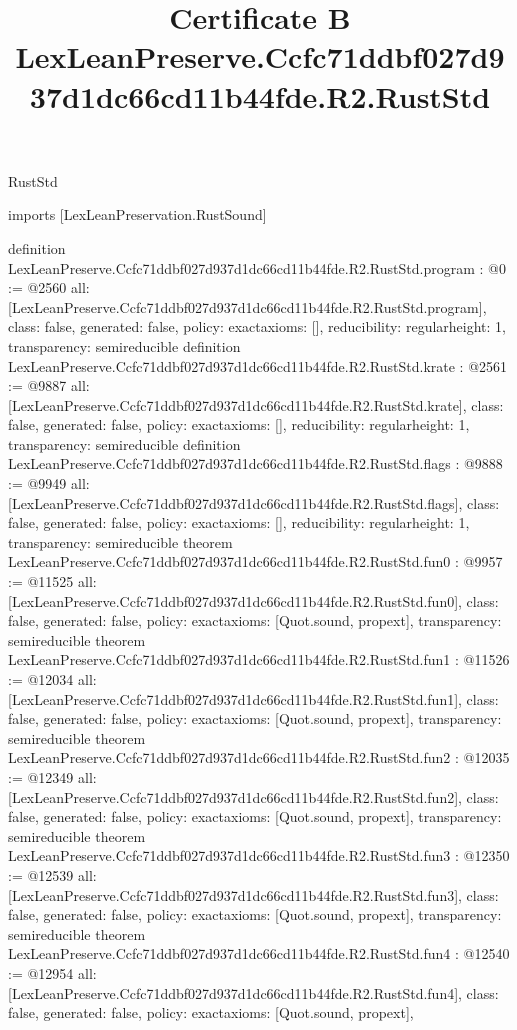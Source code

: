 \begin{lexlean}{RustStd}
\title{Certificate B LexLeanPreserve.Ccfc71ddbf027d937d1dc66cd11b44fde.R2.RustStd}
\begin{coremodule}
imports [LexLeanPreservation.RustSound]

definition LexLeanPreserve.Ccfc71ddbf027d937d1dc66cd11b44fde.R2.RustStd.program : @0 := @2560 {
  all: [LexLeanPreserve.Ccfc71ddbf027d937d1dc66cd11b44fde.R2.RustStd.program],
  class: false,
  generated: false,
  policy: exact{axioms: []},
  reducibility: regular{height: 1},
  transparency: semireducible
}
definition LexLeanPreserve.Ccfc71ddbf027d937d1dc66cd11b44fde.R2.RustStd.krate : @2561 := @9887 {
  all: [LexLeanPreserve.Ccfc71ddbf027d937d1dc66cd11b44fde.R2.RustStd.krate],
  class: false,
  generated: false,
  policy: exact{axioms: []},
  reducibility: regular{height: 1},
  transparency: semireducible
}
definition LexLeanPreserve.Ccfc71ddbf027d937d1dc66cd11b44fde.R2.RustStd.flags : @9888 := @9949 {
  all: [LexLeanPreserve.Ccfc71ddbf027d937d1dc66cd11b44fde.R2.RustStd.flags],
  class: false,
  generated: false,
  policy: exact{axioms: []},
  reducibility: regular{height: 1},
  transparency: semireducible
}
theorem LexLeanPreserve.Ccfc71ddbf027d937d1dc66cd11b44fde.R2.RustStd.fun0 : @9957 := @11525 {
  all: [LexLeanPreserve.Ccfc71ddbf027d937d1dc66cd11b44fde.R2.RustStd.fun0],
  class: false,
  generated: false,
  policy: exact{axioms: [Quot.sound, propext]},
  transparency: semireducible
}
theorem LexLeanPreserve.Ccfc71ddbf027d937d1dc66cd11b44fde.R2.RustStd.fun1 : @11526 := @12034 {
  all: [LexLeanPreserve.Ccfc71ddbf027d937d1dc66cd11b44fde.R2.RustStd.fun1],
  class: false,
  generated: false,
  policy: exact{axioms: [Quot.sound, propext]},
  transparency: semireducible
}
theorem LexLeanPreserve.Ccfc71ddbf027d937d1dc66cd11b44fde.R2.RustStd.fun2 : @12035 := @12349 {
  all: [LexLeanPreserve.Ccfc71ddbf027d937d1dc66cd11b44fde.R2.RustStd.fun2],
  class: false,
  generated: false,
  policy: exact{axioms: [Quot.sound, propext]},
  transparency: semireducible
}
theorem LexLeanPreserve.Ccfc71ddbf027d937d1dc66cd11b44fde.R2.RustStd.fun3 : @12350 := @12539 {
  all: [LexLeanPreserve.Ccfc71ddbf027d937d1dc66cd11b44fde.R2.RustStd.fun3],
  class: false,
  generated: false,
  policy: exact{axioms: [Quot.sound, propext]},
  transparency: semireducible
}
theorem LexLeanPreserve.Ccfc71ddbf027d937d1dc66cd11b44fde.R2.RustStd.fun4 : @12540 := @12954 {
  all: [LexLeanPreserve.Ccfc71ddbf027d937d1dc66cd11b44fde.R2.RustStd.fun4],
  class: false,
  generated: false,
  policy: exact{axioms: [Quot.sound, propext]},
}
\end{coremodule}
\end{lexlean}
